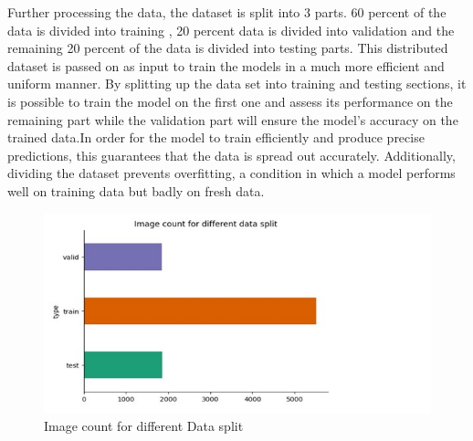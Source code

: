 Further processing the data, the dataset is split into 3 parts. 60 percent of the data is divided into training , 20 percent data is divided into validation and the remaining 20 percent of the data is divided into testing parts. This distributed dataset is passed on as input to train the models in a much more efficient and uniform manner. By splitting up the data set into training and testing sections, it is possible to train the model on the first one and assess its performance on the remaining part while the validation part will ensure the model’s accuracy on the trained data.In order for the model to train efficiently and produce precise predictions, this guarantees that the data is spread out accurately. Additionally, dividing the dataset prevents overfitting, a condition in which a model performs well on training data but badly on fresh data. 
\begin{figure}[ht]
    \centering
    \includegraphics[scale=0.5]{figures/graph2.jpg}
    \caption{Image count for different Data split}
    \label{fig:chart_a}
\end{figure}


